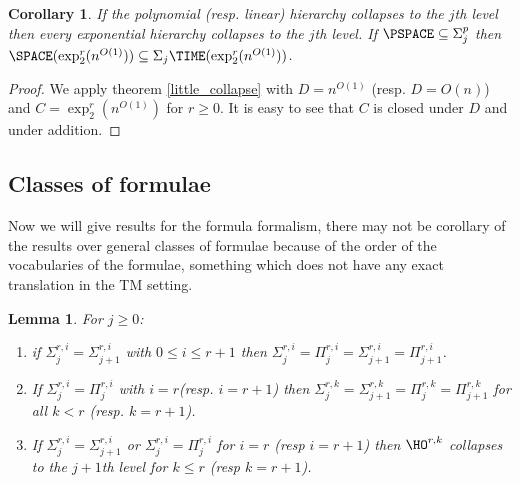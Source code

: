 \documentclass[a4paper,12pt]{article}
\newtheorem{lemma}[theorem]{Lemma}
\newtheorem{corollary}[theorem]{Corollary}
\theoremstyle{definition}
\newcommand{\ATIME}[2]{\ensuremath{\Sigma_{#2}\TIME(#1)}}
\newcommand{\hod}[2]{\ensuremath{\HO^{#1,#2}}}
\newcommand{\hoc}[3]{\ensuremath{\Sigma^{#1,#3}_{#2}}}
\newcommand{\cohoc}[3]{\ensuremath{\Pi^{#1,#3}_{#2}}}
\newcommand{\ex}[1]{\ensuremath{\exp_{2}^{#1}(n^{O(1)})}}
\begin{document}
\begin{corollary}\label{cor:collapse} 
  If the polynomial (resp. linear) hierarchy collapses to the $j$th
  level then every exponential hierarchy collapses to the $j$th
  level. If $\PSPACE\subseteq\Sigma^{p}_{j}$ then
  $\SPACE(\ex{r})\subseteq\ATIME{\ex r}{j}$.
\end{corollary}
\begin{proof}We apply theorem \ref{little_collapse} with $D=n^{O(1)}$
  (resp. $D=O(n)$) and $C=\ex r$ for $r\ge 0$. It is easy to see that
  $C$ is closed under $D$ and under addition.
\end{proof}





































\subsection{Classes of formulae}
Now we will give results for the formula formalism, there may
not be corollary of the results over general classes of formulae
because of the order of the vocabularies of the formulae, something
which does not have any exact translation in the TM setting.

\begin{lemma}\label{lem:collapse}For $j\ge0$:
  \begin{enumerate}
  \item if $\hoc{r}{j}{i}=\hoc{r}{j+1}{i}$ with $0\le i\le r+1$ then
    $\hoc{r}{j}{i}=\cohoc{r}{j}{i}=\hoc{r}{j+1}{i}=\cohoc{r}{j+1}{i}$.
  \item If $\hoc{r}{j}{i}=\cohoc{r}{j}{i}$ with $i=r$(resp. $i=r+1$)
    then
    $\hoc{r}{j}{k}=\hoc{r}{j+1}{k}=\cohoc{r}{j}{k}=\cohoc{r}{j+1}{k}$
    for all $k<r$ (resp. $k=r+1$).
\item If $\hoc{r}{j}{i}=\hoc{r}{j+1}{i}$ or
    $\hoc{r}{j}{i}=\cohoc{r}{j}{i}$ for $i=r$ (resp $i=r+1$) then
    \hod rk collapses to the $j+1$th level for $k\le r$ (resp $k=r+1$).
  \end{enumerate}
\end{lemma}
\end{document}
